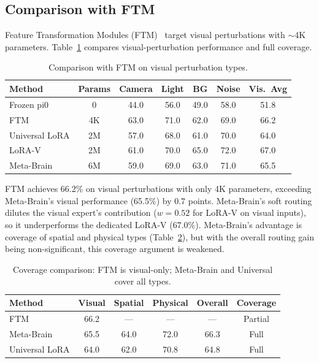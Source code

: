 \documentclass[letterpaper]{article}
\newcommand{\ours}{Meta-Brain}
\begin{document}
\subsection{Comparison with FTM}
\label{sec:exp_ftm}

Feature Transformation Modules (FTM)~\cite{zhou2025liberoplus} target visual perturbations with $\sim$4K parameters.
Table~\ref{tab:ftm} compares visual-perturbation performance and full coverage.

\begin{table}[h]
\centering
\caption{Comparison with FTM on visual perturbation types.}
\label{tab:ftm}
\begin{tabular}{lcccccc}
\toprule
Method & Params & Camera & Light & BG & Noise & Vis.\ Avg \\
\midrule
Frozen pi0 & 0 & 44.0 & 56.0 & 49.0 & 58.0 & 51.8 \\
FTM & 4K & 63.0 & 71.0 & 62.0 & 69.0 & 66.2 \\
Universal LoRA & 2M & 57.0 & 68.0 & 61.0 & 70.0 & 64.0 \\
LoRA-V & 2M & 61.0 & 70.0 & 65.0 & 72.0 & 67.0 \\
\ours{} & 6M & 59.0 & 69.0 & 63.0 & 71.0 & 65.5 \\
\bottomrule
\end{tabular}
\end{table}

FTM achieves 66.2\% on visual perturbations with only 4K parameters, exceeding \ours{}'s visual performance (65.5\%) by 0.7 points.
\ours{}'s soft routing dilutes the visual expert's contribution ($w{=}0.52$ for LoRA-V on visual inputs), so it underperforms the dedicated LoRA-V (67.0\%).
\ours{}'s advantage is coverage of spatial and physical types (Table~\ref{tab:coverage}), but with the overall routing gain being non-significant, this coverage argument is weakened.

\begin{table}[h]
\centering
\caption{Coverage comparison: FTM is visual-only; \ours{} and Universal cover all types.}
\label{tab:coverage}
\begin{tabular}{lccccc}
\toprule
Method & Visual & Spatial & Physical & Overall & Coverage \\
\midrule
FTM & 66.2 & --- & --- & --- & Partial \\
\ours{} & 65.5 & 64.0 & 72.0 & 66.3 & Full \\
Universal LoRA & 64.0 & 62.0 & 70.8 & 64.8 & Full \\
\bottomrule
\end{tabular}
\end{table}
\end{document}
